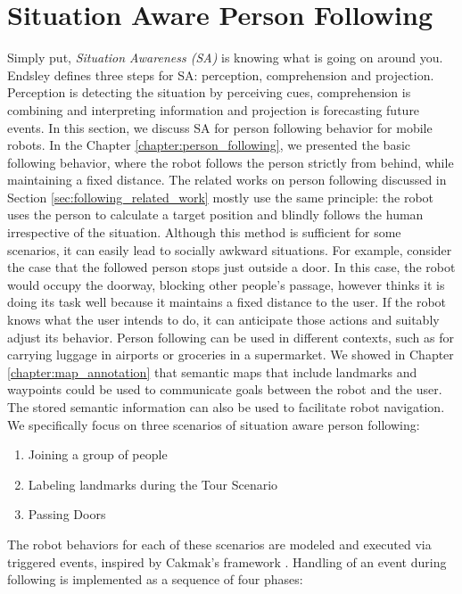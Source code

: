 \chapter{Situation Aware Person Following}
\label{chapter:following_situation_aware}

Simply put, \textit{Situation Awareness (SA)} is knowing what is going on around you. Endsley \cite{endsley2000situation} defines three steps for SA: perception, comprehension and projection. Perception is detecting the situation by perceiving cues, comprehension is combining and interpreting information and projection is forecasting future events. In this section, we discuss SA for person following behavior for mobile robots. In the Chapter \ref{chapter:person_following}, we presented the basic following behavior, where the robot follows the person strictly from behind, while maintaining a fixed distance. The related works on person following discussed in Section \ref{sec:following_related_work} mostly use the same principle: the robot uses the person to calculate a target position and blindly follows the human irrespective of the situation. Although this method is sufficient for some scenarios, it can easily lead to socially awkward situations. For example, consider the case that the followed person stops just outside a door. In this case, the robot would occupy the doorway, blocking other people's passage, however thinks it is doing its task well because it maintains a fixed distance to the user. If the robot knows what the user intends to do, it can anticipate those actions and suitably adjust its behavior. Person following can be used in different contexts, such as for carrying luggage in airports or groceries in a supermarket. We showed in Chapter \ref{chapter:map_annotation} that semantic maps that include landmarks and waypoints could be used to communicate goals between the robot and the user.  The stored semantic information can also be used to facilitate robot navigation. We specifically focus on three scenarios of situation aware person following:

\begin{enumerate}
\item Joining a group of people
\item Labeling landmarks during the Tour Scenario
\item Passing Doors
\end{enumerate}

The robot behaviors for each of these scenarios are modeled and executed via triggered events, inspired by Cakmak's framework \cite{cakmak2011using}. Handling of an event during following is implemented as a sequence of four phases:

